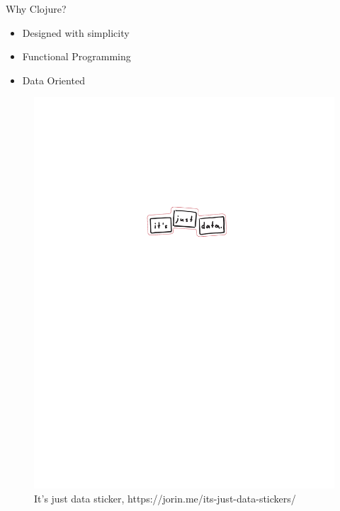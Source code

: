 \documentclass[ignorenonframetext,]{beamer}
\providecommand{\tightlist}{%
  \setlength{\itemsep}{0pt}\setlength{\parskip}{0pt}}
\begin{document}
\begin{frame}{Why Clojure?}
\protect\hypertarget{why-clojure}{}

\begin{itemize}
\tightlist
\item
  Designed with simplicity
\item
  Functional Programming
\item
  Data Oriented
\end{itemize}

\begin{figure}
\centering
\includegraphics{itsjustdata-sticker-bw.jpg}
\caption{It's just data sticker,
https://jorin.me/its-just-data-stickers/}
\end{figure}

\end{frame}
\end{document}
